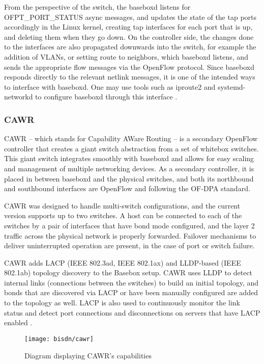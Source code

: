 \par From the perspective of the switch, the baseboxd listens for OFPT\_PORT\_STATUS async messages, and updates the state of the tap ports accordingly in the Linux
kernel, creating tap interfaces for each port that is up, and deleting them when they go down. On the controller side, the changes done to the interfaces are also
propagated downwards into the switch, for example the addition of VLANs, or setting route to neighbors, which baseboxd listens, and sends the appropriate flow
messages via the OpenFlow protocol. Since baseboxd responds directly to the relevant netlink messages, it is one of the intended ways to interface with baseboxd.
One may use tools such as iproute2 and systemd-networkd to configure baseboxd through this interface \cite{CITE - docs.bisdn.de}.

\subsubsection {CAWR}

CAWR – which stands for Capability AWare Routing – is a secondary OpenFlow controller that creates a giant switch abstraction from a set of whitebox switches. This 
giant switch integrates smoothly with baseboxd and allows for easy scaling and management of multiple networking devices. As a secondary controller, it is placed in
between baseboxd and the physical switches, and both its northbound and southbound interfaces are OpenFlow and following the OF-DPA standard.

\par CAWR was designed to handle multi-switch configurations, and the current version supports up to two switches. A host can be connected to each of the switches by
a pair of interfaces that have bond mode configured, and the layer 2 traffic across the physical network is properly forwarded. Failover mechanisms to deliver
uninterrupted operation are present, in the case of port or switch failure.

\par CAWR adds LACP (IEEE 802.3ad, IEEE 802.1ax) and LLDP-based (IEEE 802.1ab) topology discovery to the Basebox setup. CAWR uses LLDP to detect internal links
(connections between the switches) to build an initial topology, and bonds that are discovered via LACP or have been manually configured are added to the topology as
well. LACP is also used to continuously monitor the link status and detect port connections and disconnections on servers that have LACP enabled 
\cite{CITE - docs.bisdn.de}.

\begin{figure} [!htbp]
    \centering
    \texttt{[image: bisdn/cawr]}
    \caption{Diagram displaying CAWR's capabilities}
\end{figure}
